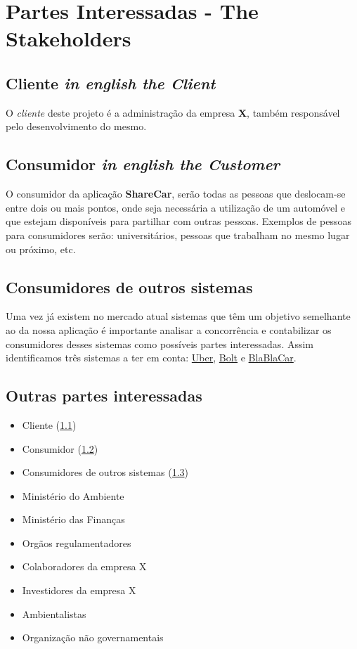 \chapter{Partes Interessadas - The Stakeholders}
\section{Cliente \emph{in english the Client}}\label{0:0.2.1}
O \emph{cliente} deste projeto é a administração da empresa \textbf{X}, também responsável pelo desenvolvimento do mesmo.

\section{Consumidor \emph{in english the Customer}}\label{0:0.2.2}
O consumidor da aplicação \textbf{ShareCar}, serão todas as pessoas que deslocam-se entre dois ou mais pontos, onde seja necessária a utilização de um automóvel e que estejam disponíveis para partilhar com outras pessoas. Exemplos de pessoas para consumidores serão: universitários, pessoas que trabalham no mesmo lugar ou próximo, etc.

\section{Consumidores de outros sistemas}\label{0:0.2.3}

Uma vez já existem no mercado atual sistemas que têm um objetivo semelhante ao da nossa aplicação é importante analisar a concorrência e contabilizar os consumidores desses sistemas como possíveis partes interessadas.
\newline
Assim identificamos três sistemas a ter em conta: \href{https://www.uber.com}{Uber}, \href{https://bolt.eu/en/}{Bolt} e \href{https://www.blablacar.pt/}{BlaBlaCar}. 


\section{Outras partes interessadas}
\begin{itemize}
    \item Cliente (\ref{0:0.2.1})
    \item Consumidor (\ref{0:0.2.2})
    \item Consumidores de outros sistemas (\ref{0:0.2.3})
    \item Ministério do Ambiente
    \item Ministério das Finanças
    \item Orgãos regulamentadores
    \item Colaboradores da empresa X
    \item Investidores da empresa X
    \item Ambientalistas
    \item Organização não governamentais
\end{itemize}


